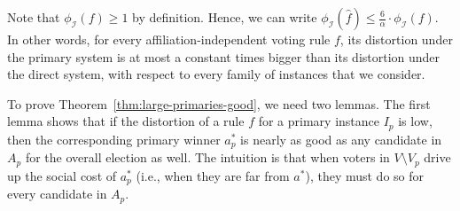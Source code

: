 \documentclass[letterpaper]{article} %
\theoremstyle{definition}
\renewcommand{\hat}{\widehat}
\newcommand{\calI}{\mathcal{I}}
\newcommand{\I}{\calI}
\begin{document}
Note that $\phi_{\I}(f) \ge 1$ by definition. Hence, we can write $\phi_{\I}(\hat{f}) \le \frac{6}{\alpha} \cdot \phi_{\I}(f)$. In other words, for every affiliation-independent voting rule $f$, its distortion under the primary system is at most a constant times bigger than its distortion under the direct system, with respect to every family of instances that we consider. %

%

To prove Theorem~\ref{thm:large-primaries-good}, we need two lemmas. The first lemma shows that if the distortion of a rule $f$ for a primary instance $I_p$ is low, then the corresponding primary winner $a^*_p$ is nearly as good as any candidate in $A_p$ for the overall election as well. The intuition is that when voters in $V \setminus V_p$ drive up the social cost of $a^*_p$ (i.e., when they are far from $a^*$), they must do so for every candidate in $A_p$. 
\end{document}

